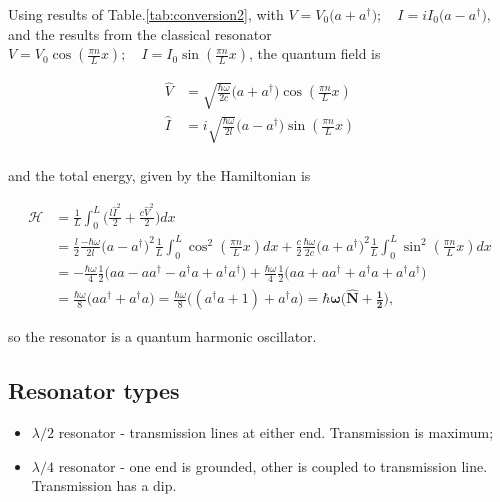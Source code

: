    Using     results     of     Table.\ref{tab:conversion2},     with
   $      V      =     V_0\bigg(a+a^\dagger\bigg);\quad      I      =
   iI_0\bigg(a-a^\dagger\bigg) $, and the  results from the classical
   resonator
   $ V=V_0\cos(\frac{\pi n}{L}x);\quad I=I_0\sin(\frac{\pi n}{L}x) $, the
   quantum field is

   \begin{align}
     \hat{V} & = \sqrt{\frac{\hbar\omega}{2c}}\bigg(a+a^\dagger\bigg)\cos(\frac{\pi n}{L}x)\\
     \hat{I} & = i\sqrt{\frac{\hbar\omega}{2l}}\bigg(a-a^\dagger\bigg)\sin(\frac{\pi n}{L}x)\\
   \end{align}

   \noindent and the total energy, given by the Hamiltonian is

   \begin{equation}\label{tlineTOtalGamil}
     \begin{aligned}
       \mathcal{H} & = \frac{1}{L}\int_{0}^{L}\bigg(\frac{l\hat{I}^2}{2}+\frac{c\hat{V}^2}{2}\bigg)dx \\
       & = \frac{l}{2}\frac{-\hbar\omega}{2l}\bigg(a-a^{\dagger}\bigg)^2\frac{1}{L}\int_{0}^{L}\cos^2(\frac{\pi n}{L}x)dx + \frac{c}{2}\frac{\hbar\omega}{2c}\bigg(a+a^{\dagger}\bigg)^2\frac{1}{L}\int_{0}^{L}\sin^2(\frac{\pi n}{L}x)dx\\
       & = -\frac{\hbar\omega}{4}\frac{1}{2}\bigg(aa-aa^{\dagger}-a^{\dagger}a+a^{\dagger}a^{\dagger}\bigg)+\frac{\hbar\omega}{4}\frac{1}{2}\bigg(aa+aa^{\dagger}+a^{\dagger}a+a^{\dagger}a^{\dagger}\bigg)\\
       &       =      \frac{\hbar\omega}{8}\bigg(aa^{\dagger}+a^{\dagger}a\bigg)=
       \frac{\hbar\omega}{8}\bigg((a^{\dagger}a+1)+a^{\dagger}a\bigg)=\mathbf{\hbar\omega\bigg(\hat{N}+\frac{1}{2}\bigg)},
     \end{aligned}
   \end{equation}

   \noindent so the resonator is a quantum harmonic oscillator.

   \subsection{Resonator types}
   \label{sec:resonator-types}

   \begin{itemize}
   \item  $\lambda/2$  resonator  -   transmission  lines  at  either
     end. Transmission is maximum;
   \item  $\lambda/4$  resonator -  one  end  is grounded,  other  is
     coupled to transmission line. Transmission has a dip.
   \end{itemize}

